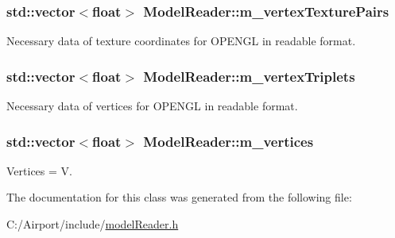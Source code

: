 \subsubsection[{\texorpdfstring{m\+\_\+vertex\+Texture\+Pairs}{m_vertexTexturePairs}}]{\setlength{\rightskip}{0pt plus 5cm}std\+::vector$<$float$>$ Model\+Reader\+::m\+\_\+vertex\+Texture\+Pairs\hspace{0.3cm}{\ttfamily [private]}}\hypertarget{class_model_reader_a1645f9266005e6ba037ff18fd95a14e2}{}\label{class_model_reader_a1645f9266005e6ba037ff18fd95a14e2}
Necessary data of texture coordinates for O\+P\+E\+N\+GL in readable format. 
\subsubsection[{\texorpdfstring{m\+\_\+vertex\+Triplets}{m_vertexTriplets}}]{\setlength{\rightskip}{0pt plus 5cm}std\+::vector$<$float$>$ Model\+Reader\+::m\+\_\+vertex\+Triplets\hspace{0.3cm}{\ttfamily [private]}}\hypertarget{class_model_reader_a383b63a003d95c976c2abdf6acd96f90}{}\label{class_model_reader_a383b63a003d95c976c2abdf6acd96f90}
Necessary data of vertices for O\+P\+E\+N\+GL in readable format. 
\subsubsection[{\texorpdfstring{m\+\_\+vertices}{m_vertices}}]{\setlength{\rightskip}{0pt plus 5cm}std\+::vector$<$float$>$ Model\+Reader\+::m\+\_\+vertices\hspace{0.3cm}{\ttfamily [private]}}\hypertarget{class_model_reader_a31bedc9d7bcfcb8385dab2538a9fe901}{}\label{class_model_reader_a31bedc9d7bcfcb8385dab2538a9fe901}
Vertices = V. 

The documentation for this class was generated from the following file\+:\begin{DoxyCompactItemize}
\item 
C\+:/\+Airport/include/\hyperlink{model_reader_8h}{model\+Reader.\+h}\end{DoxyCompactItemize}
